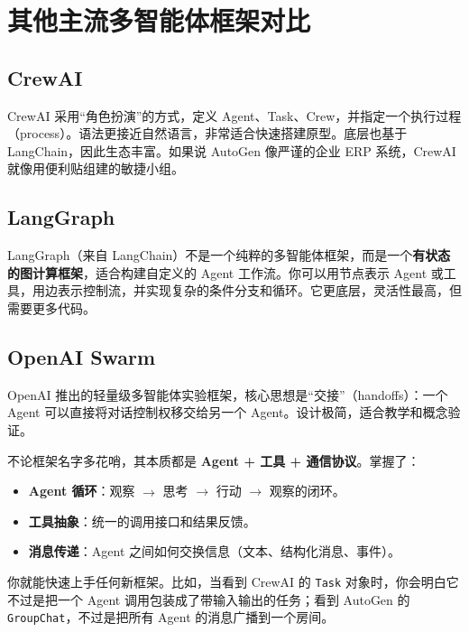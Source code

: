 \documentclass[11pt,a4paper]{article}
\begin{document}
\section{其他主流多智能体框架对比}
\subsection{CrewAI}
CrewAI 采用“角色扮演”的方式，定义 Agent、Task、Crew，并指定一个执行过程（process）。语法更接近自然语言，非常适合快速搭建原型。底层也基于 LangChain，因此生态丰富。如果说 AutoGen 像严谨的企业 ERP 系统，CrewAI 就像用便利贴组建的敏捷小组。

\subsection{LangGraph}
LangGraph（来自 LangChain）不是一个纯粹的多智能体框架，而是一个\textbf{有状态的图计算框架}，适合构建自定义的 Agent 工作流。你可以用节点表示 Agent 或工具，用边表示控制流，并实现复杂的条件分支和循环。它更底层，灵活性最高，但需要更多代码。

\subsection{OpenAI Swarm}
OpenAI 推出的轻量级多智能体实验框架，核心思想是“交接”（handoffs）：一个 Agent 可以直接将对话控制权移交给另一个 Agent。设计极简，适合教学和概念验证。

\begin{tcolorbox}[breakable, colback=green!5!white, colframe=green!75!black, title=如何举一反三？]
不论框架名字多花哨，其本质都是 \textbf{Agent + 工具 + 通信协议}。掌握了：
\begin{itemize}
    \item \textbf{Agent 循环}：观察 $\to$ 思考 $\to$ 行动 $\to$ 观察的闭环。
    \item \textbf{工具抽象}：统一的调用接口和结果反馈。
    \item \textbf{消息传递}：Agent 之间如何交换信息（文本、结构化消息、事件）。
\end{itemize}
你就能快速上手任何新框架。比如，当看到 CrewAI 的 \texttt{Task} 对象时，你会明白它不过是把一个 Agent 调用包装成了带输入输出的任务；看到 AutoGen 的 \texttt{GroupChat}，不过是把所有 Agent 的消息广播到一个房间。
\end{tcolorbox}
\end{document}
